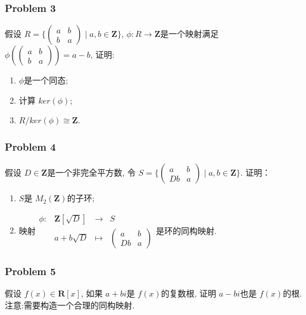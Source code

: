 \documentclass[a4paper,12pt]{ctexart}
\newcommand{\Z}{\mathbf{Z}}
\newcommand{\R}{\mathbf{R}}
\begin{document}
\subsubsection*{Problem 3}
    假设 $ R=\{\begin{pmatrix}a&b\\b&a\end{pmatrix}\mid a,b\in\Z\} $, 
    $ \phi:R\rightarrow\Z $是一个映射满足 $ \phi(\begin{pmatrix}a&b\\b&a\end{pmatrix})=a-b $,
    证明:
    \begin{enumerate}
      \item $ \phi $是一个同态;
      \item 计算 $ ker(\phi) $;
      \item $ R/ker(\phi)\cong\Z $. 
    \end{enumerate} 
\subsubsection*{Problem 4}
    假设 $ D\in\Z $是一个非完全平方数, 
    令 $ S=\{\begin{pmatrix}a &b\\Db &a\end{pmatrix}\mid a,b\in \Z\} $. 证明：
    \begin{enumerate}
      \item $ S $是 $ M_2(\Z) $的子环;
      \item 映射$ \begin{array}{rccc}
        \phi:&\Z[\sqrt{D}]&\rightarrow&S\\
        &a+b\sqrt{D}&\mapsto&\begin{pmatrix}a &b\\Db &a\end{pmatrix}
      \end{array} $是环的同构映射.
    \end{enumerate}
\subsubsection*{Problem 5}
    假设 $ f(x)\in\R[x] $, 如果 $ a+bi $是 $ f(x) $的复数根, 证明 $ a-bi $也是 $ f(x) $的根.
    注意:需要构造一个合理的同构映射. 
 
\end{document}
